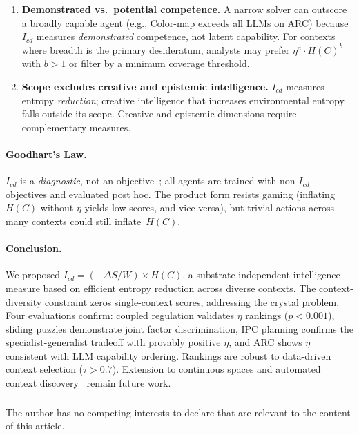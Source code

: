 \documentclass[runningheads,a4paper]{llncs}
\begin{document}
\begin{enumerate}
\item \textbf{Demonstrated vs.\ potential competence.} A narrow solver can outscore a broadly capable agent (e.g., Color-map exceeds all LLMs on ARC) because $I_{cd}$ measures \emph{demonstrated} competence, not latent capability. For contexts where breadth is the primary desideratum, analysts may prefer $\eta^a \cdot H(C)^b$ with $b > 1$ or filter by a minimum coverage threshold.
\item \textbf{Scope excludes creative and epistemic intelligence.} $I_{cd}$ measures entropy \emph{reduction}; creative intelligence that increases environmental entropy falls outside its scope. Creative and epistemic dimensions require complementary measures.
\end{enumerate}

\paragraph{Goodhart's Law.} $I_{cd}$ is a \emph{diagnostic}, not an objective~\cite{goodhart1984problems}; all agents are trained with non-$I_{cd}$ objectives and evaluated post hoc. The product form resists gaming (inflating $H(C)$ without $\eta$ yields low scores, and vice versa), but trivial actions across many contexts could still inflate~$H(C)$.

\paragraph{Conclusion.} We proposed $I_{cd} = (-\Delta S / W) \times H(C)$, a substrate-independent intelligence measure based on efficient entropy reduction across diverse contexts. The context-diversity constraint zeros single-context scores, addressing the crystal problem. Four evaluations confirm: coupled regulation validates $\eta$ rankings ($p < 0.001$), sliding puzzles demonstrate joint factor discrimination, IPC planning confirms the specialist-generalist tradeoff with provably positive $\eta$, and ARC shows $\eta$ consistent with LLM capability ordering. Rankings are robust to data-driven context selection ($\tau > 0.7$). Extension to continuous spaces and automated context discovery~\cite{tishby1999information,wang2006rigid} remain future work.

\begin{credits}
\subsubsection{\discintname}
The author has no competing interests to declare that are relevant to the content of this article.
\end{credits}



\end{document}

